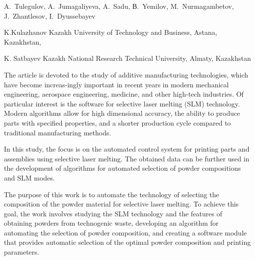 
\begin{header}

A.~Tulegulov,
A.~Jumagaliyeva\envelope,
A.~Sadu,
В.~Yemilov,
M.~Nurmagambetov,
J.~Zhantlesov,
I.~Dyussebayev
\end{header}

\begin{affil}
K.Kulazhanov Kazakh University of Technology and Business, Astana, Kazakhstan,

K. Satbayev Kazakh National Research Technical University, Almaty, Kazakhstan

\end{affil}

The article is devoted to the study of additive manufacturing
technologies, which have become increas-ingly important in recent years
in modern mechanical engineering, aerospace engineering, medicine, and
other high-tech industries. Of particular interest is the software for
selective laser melting (SLM) technology. Modern algorithms allow for
high dimensional accuracy, the ability to produce parts with specified
properties, and a shorter production cycle compared to traditional
manufacturing methods.

In this study, the focus is on the automated control system for printing
parts and assemblies using selective laser melting. The obtained data
can be further used in the development of algorithms for automated
selection of powder compositions and SLM modes.

The purpose of this work is to automate the technology of selecting the
composition of the powder material for selective laser melting. To
achieve this goal, the work involves studying the SLM technology and the
features of obtaining powders from technogenic waste, developing an
algorithm for automating the selection of powder composition, and
creating a software module that provides automatic selection of the
optimal powder composition and printing parameters.

